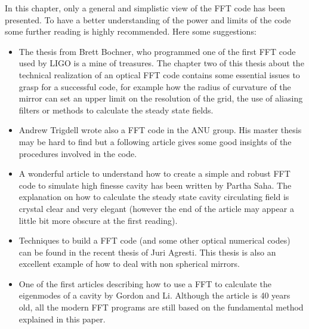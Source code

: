 In this chapter, only a general and simplistic view of the FFT code has been presented. To have a better understanding of the power and limits of the code some further reading is highly recommended. Here some suggestions:
\begin{itemize}
  \item The thesis from Brett Bochner\cite{Bochner}, who programmed one of the first FFT code used by LIGO is a mine of treasures. The chapter two of this thesis about the technical realization of an optical FFT code contains some essential issues to grasp for a successful code, for example how the radius of curvature of the mirror can set an upper limit on the resolution of the grid, the use of aliasing filters or methods to calculate the steady state fields.

  \item Andrew Trigdell wrote also a FFT code in the ANU group. His master thesis may be hard to find but a following article\cite{Tridgell} gives some good insights of the procedures involved in the code.

  \item A wonderful article to understand how to create a simple and robust FFT code to simulate high finesse cavity has been written by Partha Saha. The explanation on how to calculate the steady state cavity circulating field is crystal clear and very elegant (however the end of the article may appear a little bit more obscure at the first reading).

  \item Techniques to build a FFT code (and some other optical numerical codes) can be found in the recent thesis of Juri Agresti\cite{Juri}. This thesis is also an excellent example of how to deal with non spherical mirrors.

 \item One of the first articles describing how to use a FFT to calculate the eigenmodes of a cavity by Gordon and Li\cite{Gordon}. Although the article is 40 years old, all the modern FFT programs are still based on the fundamental method explained in this paper.

\end{itemize}








